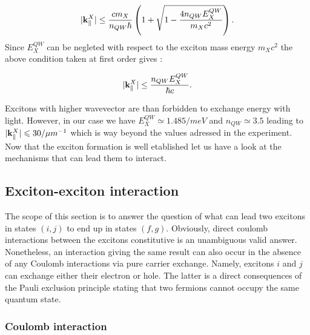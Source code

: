 \begin{equation}
    |\mathbf{k}_\parallel^X| \leq \dfrac{cm_X}{n_{QW}\hbar}\left(1+\sqrt{1-\dfrac{4n_{QW}E_X^{QW}}{m_Xc^2}} \right).
    \label{eq:k_max}
\end{equation}
Since $E_X^{QW}$ can be negleted with respect to the exciton mass energy $m_Xc^2$ the above condition taken at first order gives :

\begin{equation}
    |\mathbf{k}_\parallel^X| \leq \dfrac{n_{QW}E_X^{QW}}{\hbar c}.
    \label{eq:kmax_approx}
\end{equation}


\noindent Excitons with higher wavevector are than forbidden to exchange energy with light. However, in our case we have $E_X^{QW} \simeq 1.485  /  meV$ and $n_{QW} \simeq 3.5$ leading to $|\mathbf{k}_\parallel^X| \leqslant 30 / \mu m^{-1}$ which is way beyond
the values adressed in the experiment. Now that the exciton formation is well etablished let us have a look at the mechanisms that can lead them to interact.
 

\subsection{Exciton-exciton interaction}
\label{sub:exciton_exciton_interaction}

The scope of this section is to answer the question of what can lead two excitons in states $(i,j)$ to end up in states $(f,g)$. Obviously, direct
coulomb interactions between the excitons constitutive is an unambiguous valid answer. Nonetheless, an interaction giving the same result can also occur in the absence of any Coulomb interactions via pure carrier exchange.
Namely, excitons $i$ and $j$ can exchange either their electron or hole. The latter is a direct consequences of the Pauli exclusion principle stating that two fermions cannot occupy the same quantum state. 


\subsubsection{Coulomb interaction}

